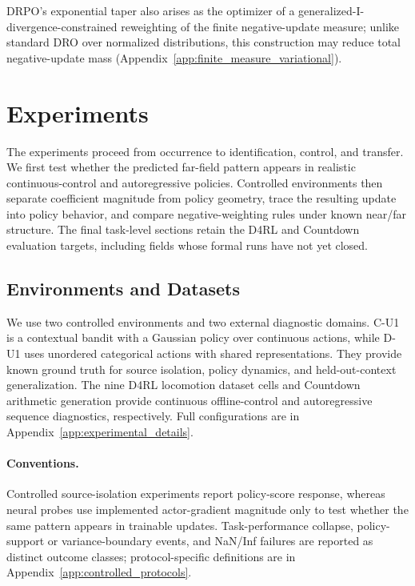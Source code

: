 \documentclass{article}
\theoremstyle{plain}
\theoremstyle{definition}
\theoremstyle{remark}
\begin{document}
DRPO's exponential taper also arises as the optimizer of a
generalized-I-divergence-constrained reweighting of the finite
negative-update measure; unlike standard DRO over normalized distributions,
this construction may reduce total negative-update mass
(Appendix~\ref{app:finite_measure_variational}).

\section{Experiments}
\label{sec:experiments}

The experiments proceed from occurrence to identification, control, and
transfer. We
first test whether the predicted far-field pattern appears in realistic
continuous-control and autoregressive policies. Controlled environments then
separate coefficient magnitude from policy geometry, trace the resulting
update into policy behavior, and compare negative-weighting rules under known
near/far structure. The final task-level sections retain the D4RL and Countdown
evaluation targets, including fields whose formal runs have not yet closed.

\subsection{Environments and Datasets}
\label{sec:environments_datasets}

We use two controlled environments and two external diagnostic domains.
C-U1 is a contextual bandit with a Gaussian policy over continuous actions,
while D-U1 uses unordered categorical actions with shared representations.
They provide known ground truth for source isolation, policy dynamics, and
held-out-context generalization. The nine D4RL locomotion dataset cells and
Countdown arithmetic generation provide continuous offline-control and
autoregressive sequence diagnostics, respectively. Full configurations are
in Appendix~\ref{app:experimental_details}.

\paragraph{Conventions.}
Controlled source-isolation experiments report policy-score response,
whereas neural probes use implemented actor-gradient magnitude only to
test whether the same pattern appears in trainable updates.
Task-performance collapse, policy-support or variance-boundary events,
and NaN/Inf failures are reported as distinct outcome classes;
protocol-specific definitions are in
Appendix~\ref{app:controlled_protocols}.
\end{document}
